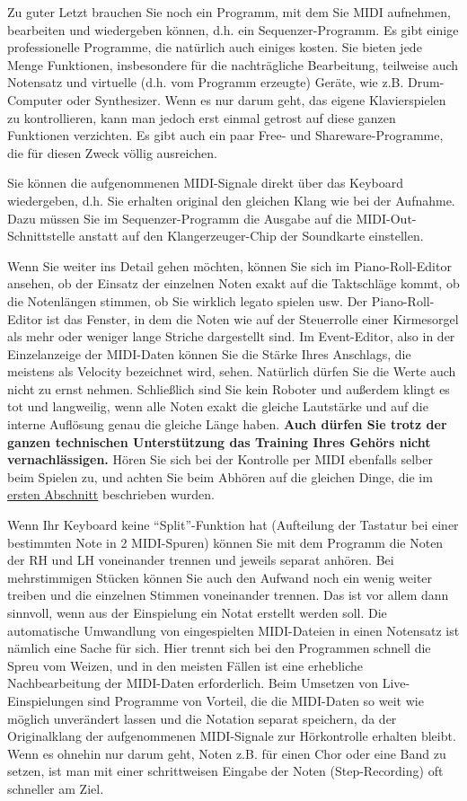 Zu guter Letzt brauchen Sie noch ein Programm, mit dem Sie MIDI aufnehmen, bearbeiten und wiedergeben können, d.h. ein Sequenzer-Programm.
Es gibt einige professionelle Programme, die natürlich auch einiges kosten.
Sie bieten jede Menge Funktionen, insbesondere für die nachträgliche Bearbeitung, teilweise auch Notensatz und virtuelle (d.h. vom Programm erzeugte) Geräte, wie z.B. Drum-Computer oder Synthesizer.
Wenn es nur darum geht, das eigene Klavierspielen zu kontrollieren, kann man jedoch erst einmal getrost auf diese ganzen Funktionen verzichten.
Es gibt auch ein paar Free- und Shareware-Programme, die für diesen Zweck völlig ausreichen.

Sie können die aufgenommenen MIDI-Signale direkt über das Keyboard wiedergeben, d.h. Sie erhalten original den gleichen Klang wie bei der Aufnahme.
Dazu müssen Sie im Sequenzer-Programm die Ausgabe auf die MIDI-Out-Schnittstelle anstatt auf den Klangerzeuger-Chip der Soundkarte einstellen.

\hypertarget{midi_check}{}

Wenn Sie weiter ins Detail gehen möchten, können Sie sich im Piano-Roll-Editor ansehen, ob der Einsatz der einzelnen Noten exakt auf die Taktschläge kommt, ob die Notenlängen stimmen, ob Sie wirklich legato spielen usw.
Der Piano-Roll-Editor ist das Fenster, in dem die Noten wie auf der Steuerrolle einer Kirmesorgel als mehr oder weniger lange Striche dargestellt sind.
Im Event-Editor, also in der Einzelanzeige der MIDI-Daten können Sie die Stärke Ihres Anschlags, die meistens als Velocity bezeichnet wird, sehen.
Natürlich dürfen Sie die Werte auch nicht zu ernst nehmen. Schließlich sind Sie kein Roboter und außerdem klingt es tot und langweilig, wenn alle Noten exakt die gleiche Lautstärke und auf die interne Auflösung genau die gleiche Länge haben.
\textbf{Auch dürfen Sie trotz der ganzen technischen Unterstützung das Training Ihres Gehörs nicht vernachlässigen.}
Hören Sie sich bei der Kontrolle per MIDI ebenfalls selber beim Spielen zu, und achten Sie beim Abhören auf die gleichen Dinge, die im \hyperlink{c1iii13}{ersten Abschnitt} beschrieben wurden.

Wenn Ihr Keyboard keine \enquote{Split}-Funktion hat (Aufteilung der Tastatur bei einer bestimmten Note in 2 MIDI-Spuren) können Sie mit dem Programm die Noten der RH und LH voneinander trennen und jeweils separat anhören.
Bei mehrstimmigen Stücken können Sie auch den Aufwand noch ein wenig weiter treiben und die einzelnen Stimmen voneinander trennen.
Das ist vor allem dann sinnvoll, wenn aus der Einspielung ein Notat erstellt werden soll.
Die automatische Umwandlung von eingespielten MIDI-Dateien in einen Notensatz ist nämlich eine Sache für sich.
Hier trennt sich bei den Programmen schnell die Spreu vom Weizen, und in den meisten Fällen ist eine erhebliche Nachbearbeitung der MIDI-Daten erforderlich.
Beim Umsetzen von Live-Einspielungen sind Programme von Vorteil, die die MIDI-Daten so weit wie möglich unverändert lassen und die Notation separat speichern, da der Originalklang der aufgenommenen MIDI-Signale zur Hörkontrolle erhalten bleibt.
Wenn es ohnehin nur darum geht, Noten z.B. für einen Chor oder eine Band zu setzen, ist man mit einer schrittweisen Eingabe der Noten (Step-Recording) oft schneller am Ziel.


